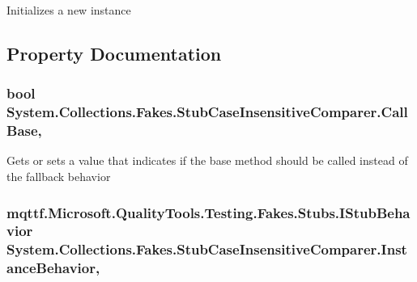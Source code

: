 Initializes a new instance



\subsection{Property Documentation}
\hypertarget{class_system_1_1_collections_1_1_fakes_1_1_stub_case_insensitive_comparer_a52d7e63fb5b75deeae6f20f54155e3b5}{
\subsubsection[{Call\-Base}]{\setlength{\rightskip}{0pt plus 5cm}bool System.\-Collections.\-Fakes.\-Stub\-Case\-Insensitive\-Comparer.\-Call\-Base\hspace{0.3cm}{\ttfamily [get]}, {\ttfamily [set]}}}\label{class_system_1_1_collections_1_1_fakes_1_1_stub_case_insensitive_comparer_a52d7e63fb5b75deeae6f20f54155e3b5}


Gets or sets a value that indicates if the base method should be called instead of the fallback behavior

\hypertarget{class_system_1_1_collections_1_1_fakes_1_1_stub_case_insensitive_comparer_a2dd2492904fc62fae63ae00e57282f67}{
\subsubsection[{Instance\-Behavior}]{\setlength{\rightskip}{0pt plus 5cm}mqttf.\-Microsoft.\-Quality\-Tools.\-Testing.\-Fakes.\-Stubs.\-I\-Stub\-Behavior System.\-Collections.\-Fakes.\-Stub\-Case\-Insensitive\-Comparer.\-Instance\-Behavior\hspace{0.3cm}{\ttfamily [get]}, {\ttfamily [set]}}}\label{class_system_1_1_collections_1_1_fakes_1_1_stub_case_insensitive_comparer_a2dd2492904fc62fae63ae00e57282f67}


